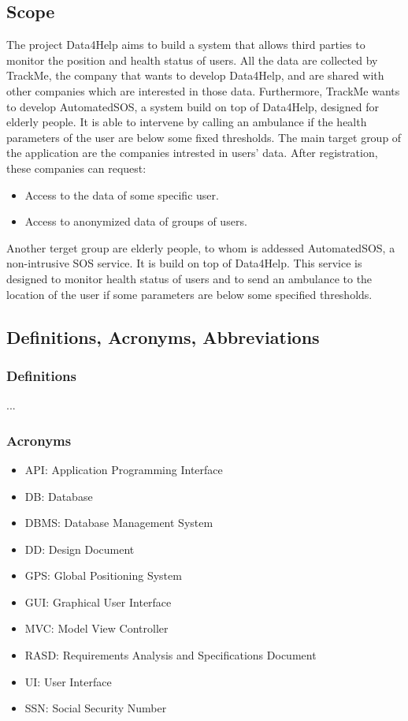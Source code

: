 \documentclass{article}
\begin{document}
\subsection{Scope}
The project Data4Help aims to build a system that allows third parties to monitor the position and health status of users. All the data are collected by TrackMe, the company that wants to develop Data4Help, and are shared with other companies which are interested in those data. Furthermore, TrackMe wants to develop AutomatedSOS, a system build on top of Data4Help, designed for elderly people. It is able to intervene by calling an ambulance if the health parameters of the user are below some fixed thresholds.
The main target group of the application are the companies intrested in users' data.
After registration, these companies can request:
\begin{itemize}
\item Access to the data of some specific user.
\item Access to anonymized data of groups of users.
\end{itemize}
Another terget group are elderly people, to whom is addessed AutomatedSOS, a non-intrusive SOS service. It is build on top of Data4Help. This service is designed to monitor health status of users and to send an ambulance to the location of the user if some parameters are below some specified thresholds.
\subsection{Definitions, Acronyms, Abbreviations}
\subsubsection{Definitions}
...
\subsubsection{Acronyms}
\begin{itemize}
\item API: Application Programming Interface
\item DB: Database
\item DBMS: Database Management System 
\item DD: Design Document
\item GPS: Global Positioning System
\item GUI: Graphical User Interface
\item MVC: Model View Controller
\item RASD: Requirements Analysis and Specifications Document
\item UI: User Interface
\item SSN: Social Security Number
\end{itemize}
\end{document}
